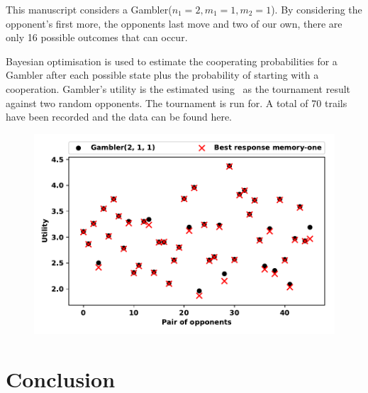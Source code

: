 \documentclass[10pt]{article}
\begin{document}
This manuscript considers a Gambler($n_1 = 2, m_1 = 1, m_2 = 1$). By considering
the opponent's first more, the opponents last move and two of our own, there are
only 16 possible outcomes that can occur.




Bayesian optimisation is used to estimate the cooperating probabilities for
a Gambler after each possible state plus the probability of starting with a 
cooperation. Gambler's utility is the estimated using~\cite{axelrodproject}
as the tournament result against two random opponents. The tournament is
run for. A total of 70 trails have been recorded and the data can be found here.

\begin{figure}
    \centering
    \includegraphics[width=.6\textwidth]{img/gambler_performance_against_mem_one.pdf}
\end{figure}



\section{Conclusion}





\appendix

\end{document}
